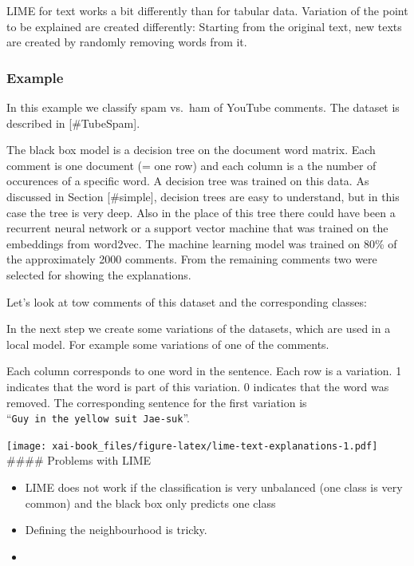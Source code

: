 \documentclass[12pt,]{krantz}
\theoremstyle{definition}
\theoremstyle{definition}
\theoremstyle{definition}
\theoremstyle{remark}
\begin{document}
LIME for text works a bit differently than for tabular data. Variation
of the point to be explained are created differently: Starting from the
original text, new texts are created by randomly removing words from it.

\subsubsection{Example}\label{example-4}

In this example we classify spam vs.~ham of YouTube comments. The
dataset is described in {[}\#TubeSpam{]}.

The black box model is a decision tree on the document word matrix. Each
comment is one document (= one row) and each column is a the number of
occurences of a specific word. A decision tree was trained on this data.
As discussed in Section {[}\#simple{]}, decision trees are easy to
understand, but in this case the tree is very deep. Also in the place of
this tree there could have been a recurrent neural network or a support
vector machine that was trained on the embeddings from word2vec. The
machine learning model was trained on 80\% of the approximately 2000
comments. From the remaining comments two were selected for showing the
explanations.

Let's look at tow comments of this dataset and the corresponding
classes:

\hypertarget{htmlwidget-aa0035eeecbb5583be9e}{}

In the next step we create some variations of the datasets, which are
used in a local model. For example some variations of one of the
comments.

\hypertarget{htmlwidget-a0373763f1f6bdbb8900}{}

Each column corresponds to one word in the sentence. Each row is a
variation. 1 indicates that the word is part of this variation. 0
indicates that the word was removed. The corresponding sentence for the
first variation is ``\texttt{Guy\ in\ the\ yellow\ suit\ Jae-suk}''.

\texttt{[image: xai-book\_files/figure-latex/lime-text-explanations-1.pdf]}
\#\#\#\# Problems with LIME

\begin{itemize}
\item
  LIME does not work if the classification is very unbalanced (one class
  is very common) and the black box only predicts one class
\item
  Defining the neighbourhood is tricky.
\item
\end{itemize}
\end{document}
